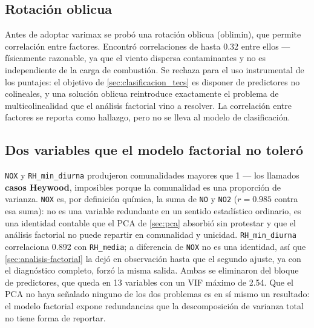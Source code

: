 \subsection{Rotación oblicua}

Antes de adoptar varimax se probó una rotación oblicua (oblimin), que permite
correlación entre factores. Encontró correlaciones de hasta 0.32 entre ellos
--- físicamente razonable, ya que el viento dispersa contaminantes y no es
independiente de la carga de combustión. Se rechaza para el uso instrumental
de los puntajes: el objetivo de \cref{sec:clasificacion_tecs} es disponer de
predictores no colineales, y una solución oblicua reintroduce exactamente el
problema de multicolinealidad que el análisis factorial vino a resolver. La
correlación entre factores se reporta como hallazgo, pero no se lleva al
modelo de clasificación.

\subsection{Dos variables que el modelo factorial no toleró}

\texttt{NOX} y \texttt{RH\_min\_diurna} produjeron comunalidades mayores que 1
--- los llamados \textbf{casos Heywood}, imposibles porque la comunalidad es
una proporción de varianza. \texttt{NOX} es, por definición química, la suma
de \texttt{NO} y \texttt{NO2} ($r=0.985$ contra esa suma): no es una variable
redundante en un sentido estadístico ordinario, es una identidad contable que
el PCA de \cref{sec:pca} absorbió sin protestar y que el análisis factorial no
puede repartir en comunalidad y unicidad. \texttt{RH\_min\_diurna}
correlaciona 0.892 con \texttt{RH\_media}; a diferencia de \texttt{NOX} no es
una identidad, así que \cref{sec:analisis-factorial} la dejó en observación hasta que el
segundo ajuste, ya con el diagnóstico completo, forzó la misma salida. Ambas
se eliminaron del bloque de predictores, que queda en 13 variables con un VIF
máximo de 2.54. Que el PCA no haya señalado ninguno de los dos problemas es en
sí mismo un resultado: el modelo factorial expone redundancias que la
descomposición de varianza total no tiene forma de reportar.
